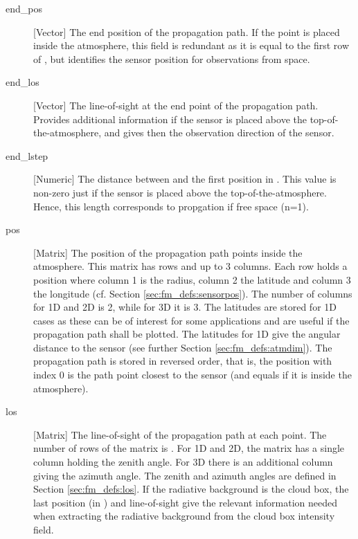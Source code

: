 \begin{description}
   \item[end\_pos] [Vector] The end position of the propagation path. If
     the point is placed inside the atmosphere, this field is redundant as it
     is equal to the first row of , but identifies the sensor
     position for observations from space.

   \item[end\_los] [Vector] The line-of-sight at the end point of the
     propagation path. Provides additional information if the sensor is placed
     above the top-of-the-atmosphere, and gives then the observation direction
     of the sensor.

   \item[end\_lstep] [Numeric] The distance between 
     and the first position in . This value is non-zero just if
     the sensor is placed above the top-of-the-atmosphere. Hence, this length
     corresponds to propgation if free space (n=1).

   \item[pos] [Matrix] The position of the propagation path points inside the
     atmosphere. This matrix has  rows and up to 3 columns. Each
     row holds a position where column 1 is the radius, column 2 the latitude
     and column 3 the longitude (cf. Section \ref{sec:fm_defs:sensorpos}). The
     number of columns for 1D and 2D is 2, while for 3D it is 3. The latitudes
     are stored for 1D cases as these can be of interest for some applications
     and are useful if the propagation path shall be plotted. The latitudes for
     1D give the angular distance to the sensor (see further Section
     \ref{sec:fm_defs:atmdim}). The propagation path is stored in reversed
     order, that is, the position with index 0 is the path point closest to the
     sensor (and equals  if it is inside the atmosphere).
     
   \item[los] [Matrix] The line-of-sight of the propagation path at
     each point. The number of rows of the matrix is .
     For 1D and 2D, the matrix has a single column holding the zenith
     angle. For 3D there is an additional column giving the azimuth
     angle. The zenith and azimuth angles are defined in
     Section \ref{sec:fm_defs:los}. If the radiative background is the
     cloud box, the last position (in ) and
     line-of-sight give the relevant information needed when
     extracting the radiative background from the cloud box intensity
     field.
     

\end{description}
